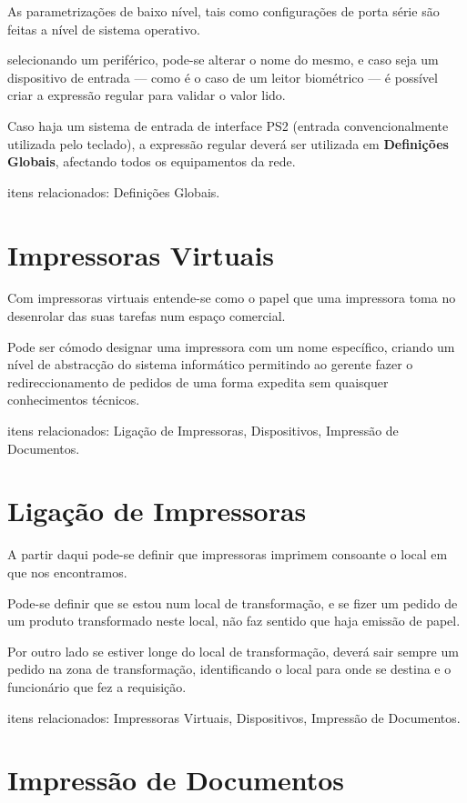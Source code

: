 \documentclass[a4paper,11pt,openany]{memoir}
\begin{document}
As parametrizações de baixo nível, tais como configurações de porta série são feitas a nível de sistema operativo.

selecionando um periférico, pode-se alterar o nome do mesmo, e caso seja um dispositivo de entrada --- como é o caso 
de um leitor biométrico --- é possível criar a expressão regular para validar o valor lido.

Caso haja um sistema de entrada de interface PS2 (entrada convencionalmente utilizada pelo teclado), 
a expressão regular deverá ser utilizada em \textbf{Definições Globais}, afectando todos os equipamentos da rede.

itens relacionados: Definições Globais.

\section{Impressoras Virtuais}

Com impressoras virtuais entende-se como o papel que uma impressora toma no desenrolar das suas tarefas num espaço comercial.

Pode ser cómodo designar uma impressora com um nome específico, criando um nível de abstracção do sistema informático
permitindo ao gerente fazer o redireccionamento de pedidos de uma forma expedita sem quaisquer conhecimentos técnicos.

itens relacionados: Ligação de Impressoras, Dispositivos, Impressão de Documentos.

\section{Ligação de Impressoras}

A partir daqui pode-se definir que impressoras imprimem consoante o local em que nos encontramos.

Pode-se definir que se estou num local de transformação, e se fizer um pedido de um produto transformado neste local,
não faz sentido que haja emissão de papel.

Por outro lado se estiver longe do local de transformação, deverá sair sempre um pedido na zona de transformação, 
identificando o local para onde se destina e o funcionário que fez a requisição.

itens relacionados: Impressoras Virtuais, Dispositivos, Impressão de Documentos.

\section{Impressão de Documentos}
\end{document}
